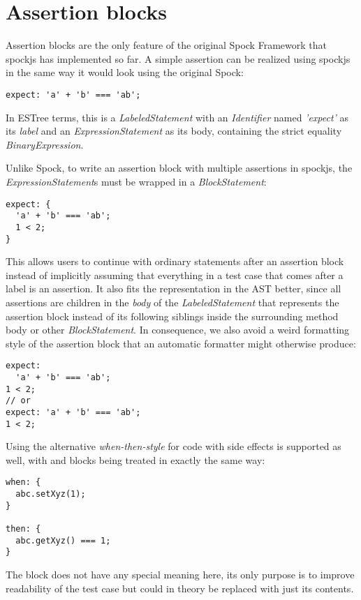 \section{Assertion blocks}
Assertion blocks are the only feature of the original Spock Framework
that spockjs has implemented so far.
A simple assertion can be realized using spockjs
in the same way it would look using the original Spock:
\autocite{SpockjsGithub}
\begin{verbatim}
expect: 'a' + 'b' === 'ab';
\end{verbatim}
In ESTree terms, this is a \textit{LabeledStatement}
with an \textit{Identifier} named \textit{'expect'} as its \textit{label}
and an \textit{ExpressionStatement} as its body,
containing the strict equality \textit{BinaryExpression}.

Unlike Spock, to write an assertion block with multiple assertions in spockjs,
the \textit{ExpressionStatement}s must be wrapped in a \textit{BlockStatement}:
\autocite{SpockjsGithub}
\begin{verbatim}
expect: {
  'a' + 'b' === 'ab';
  1 < 2;
}
\end{verbatim}
This allows users to continue with ordinary statements after an assertion block
instead of implicitly assuming that everything in a test case
that comes after a label is an assertion.
It also fits the representation in the AST better,
since all assertions are children in the \textit{body} of the
\textit{LabeledStatement} that represents the assertion block
instead of its following siblings inside
the surrounding method body or other \textit{BlockStatement}.
In consequence, we also avoid a weird formatting style
of the assertion block that an automatic formatter might otherwise produce:
\begin{verbatim}
expect:
  'a' + 'b' === 'ab';
1 < 2;
// or
expect: 'a' + 'b' === 'ab';
1 < 2;
\end{verbatim}

Using the alternative \textit{when-then-style}
for code with side effects is supported as well,
with  and  blocks
being treated in exactly the same way:
\begin{verbatim}
when: {
  abc.setXyz(1);
}

then: {
  abc.getXyz() === 1;
}
\end{verbatim}
The  block does not have any special meaning here,
its only purpose is to improve readability of the test case
but could in theory be replaced with just its contents.
\autocite{SpockjsGithub}

